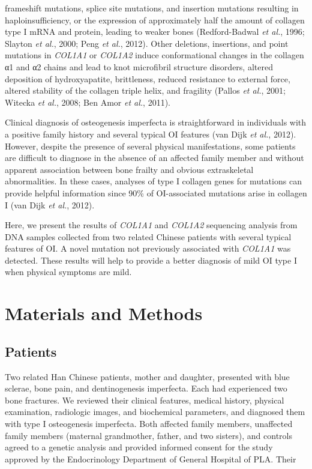 frameshift mutations, splice site mutations, and insertion mutations resulting in haploinsufficiency, or the expression of approximately half the amount of collagen type I mRNA and protein, leading to weaker bones (Redford-Badwal \textit{et al.}, 1996; Slayton \textit{et al.}, 2000; Peng \textit{et al.}, 2012). Other deletions, insertions, and point mutations in \textit{COL1A1} or \textit{COL1A2} induce conformational changes in the collagen α1 and α2 chains and lead to knot microfibril structure disorders, altered deposition of hydroxyapatite, brittleness, reduced resistance to external force, altered stability of the collagen triple helix, and fragility (Pallos \textit{et al.}, 2001; Witecka \textit{et al.}, 2008; Ben Amor \textit{et al.}, 2011).\par Clinical diagnosis of osteogenesis imperfecta is straightforward in individuals with a positive family history and several typical OI features (van Dijk \textit{et al.}, 2012). However, despite the presence of several physical manifestations, some patients are difficult to diagnose in the absence of an affected family member and without apparent association between bone frailty and obvious extraskeletal abnormalities. In these cases, analyses of type I collagen genes for mutations can provide helpful information since 90\% of OI-associated mutations arise in collagen I (van Dijk \textit{et al.}, 2012).\par Here, we present the results of \textit{COL1A1} and \textit{COL1A2} sequencing analysis from DNA samples collected from two related Chinese patients with several typical features of OI. A novel mutation not previously associated with \textit{COL1A1} was detected. These results will help to provide a better diagnosis of mild OI type I when physical symptoms are mild.\section*{Materials and Methods}\subsection*{Patients}\par Two related Han Chinese patients, mother and daughter, presented with blue sclerae, bone pain, and dentinogenesis imperfecta. Each had experienced two bone fractures. We reviewed their clinical features, medical history, physical examination, radiologic images, and biochemical parameters, and diagnosed them with type I osteogenesis imperfecta. Both affected family members, unaffected family members (maternal grandmother, father, and two sisters), and controls agreed to a genetic analysis and provided informed consent for the study approved by the Endocrinology Department of General Hospital of PLA. Their 